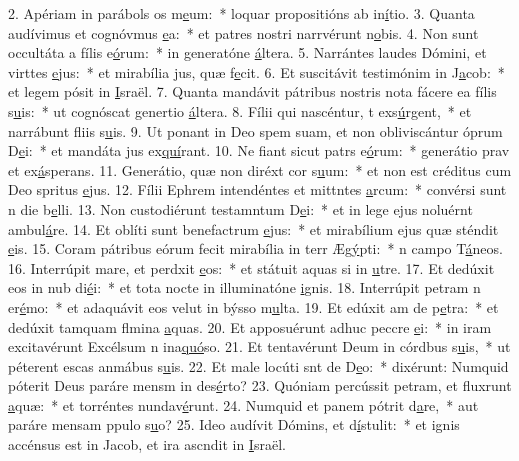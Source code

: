 2. Apériam in parábols os m\uline{e}um:~* loquar propositións ab in\uline{í}tio.
3. Quanta audívimus et cognóvmus \uline{e}a:~* et patres nostri narrvérunt n\uline{o}bis.
4. Non sunt occultáta a fílis e\uline{ó}rum:~* in generatóne \uline{á}ltera.
5. Narrántes laudes Dómini, et virttes \uline{e}jus:~* et mirabília jus, quæ f\uline{e}cit.
6. Et suscitávit testimónim in J\uline{a}cob:~* et legem pósit in \uline{I}sraël.
7. Quanta mandávit pátribus nostris nota fácere ea fílis s\uline{u}is:~* ut cognóscat genertio \uline{á}ltera.
8. Fílii qui nascéntur, t exs\uline{ú}rgent,~* et narrábunt fliis s\uline{u}is.
9. Ut ponant in Deo spem suam, et non obliviscántur óprum D\uline{e}i:~* et mandáta jus ex\uline{quí}rant.
10. Ne fiant sicut patrs e\uline{ó}rum:~* generátio prav et ex\uline{á}sperans.
11. Generátio, quæ non diréxt cor s\uline{u}um:~* et non est créditus cum Deo spritus \uline{e}jus.
12. Fílii Ephrem intendéntes et mittntes \uline{a}rcum:~* convérsi sunt n die b\uline{e}lli.
13. Non custodiérunt testamntum D\uline{e}i:~* et in lege ejus noluérnt ambul\uline{á}re.
14. Et oblíti sunt benefactrum \uline{e}jus:~* et mirabílium ejus quæ sténdit \uline{e}is.
15. Coram pátribus eórum fecit mirabília in terr Æg\uline{ý}pti:~* n campo T\uline{á}neos.
16. Interrúpit mare, et perdxit \uline{e}os:~* et státuit aquas si in \uline{u}tre.
17. Et dedúxit eos in nub di\uline{é}i:~* et tota nocte in illuminatóne \uline{i}gnis.
18. Interrúpit petram n er\uline{é}mo:~* et adaquávit eos velut in býsso m\uline{u}lta.
19. Et edúxit am de p\uline{e}tra:~* et dedúxit tamquam flmina \uline{a}quas.
20. Et apposuérunt adhuc peccre \uline{e}i:~* in iram excitavérunt Excélsum n ina\uline{quó}so.
21. Et tentavérunt Deum in córdbus s\uline{u}is,~* ut péterent escas anmábus s\uline{u}is.
22. Et male locúti snt de D\uline{e}o:~* dixérunt: Numquid póterit Deus paráre mensm in des\uline{é}rto?
23. Quóniam percússit petram, et fluxrunt \uline{a}quæ:~* et torréntes nundav\uline{é}runt.
24. Numquid et panem pótrit d\uline{a}re,~* aut paráre mensam ppulo s\uline{u}o?
25. Ideo audívit Dómins, et d\uline{í}stulit:~* et ignis accénsus est in Jacob, et ira ascndit in \uline{I}sraël.
